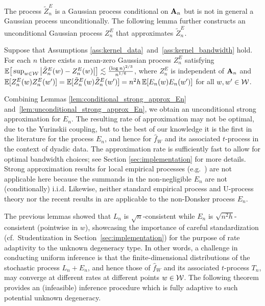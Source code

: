 The process $\tilde Z_n^E$
is a Gaussian process conditional on $\mathbf{A}_n$ but is not in general a
Gaussian process unconditionally.
The following lemma further constructs an unconditional Gaussian process
$Z_n^E$ that approximates $\tilde Z_n^E$.

\begin{lemma}
  \label{lem:unconditional_strong_approx_En}

  Suppose that Assumptions
  \ref{ass:kernel_data}~and~\ref{ass:kernel_bandwidth} hold.
  For each $n$ there exists
  a mean-zero Gaussian process $Z^E_n$ satisfying
  $\mathbb{E}\big[ \sup_{w \in \mathcal{W}} \big|\tilde Z_n^E(w) - Z_n^E(w)\big| \big]
  \lesssim \frac{(\log n)^{2/3}}{n^{1/6}}$,
  where
  $Z_n^E$ is independent of $\mathbf{A}_n$ and
  $\mathbb{E}[Z_n^E(w)Z_n^E(w')]=\mathbb{E}[\tilde Z_n^E(w)\tilde Z_n^E(w')]
  = n^2h \, \mathbb{E}[E_n(w)E_n(w')]$
  for all $w, w' \in \mathcal{W}$.
\end{lemma}

Combining Lemmas \ref{lem:conditional_strong_approx_En}
and~\ref{lem:unconditional_strong_approx_En},
we obtain an unconditional strong approximation for $E_n$.
The resulting rate of approximation may not be optimal,
due to the Yurinskii coupling, but to the best of our knowledge
it is the first in the literature for the process
$E_n$, and hence for $\hat{f}_W$ and its associated $t$-process in the
context of dyadic data.
The approximation rate is
sufficiently fast to allow for optimal bandwidth choices; see Section
\ref{sec:implementation} for more details.
Strong approximation results for local empirical processes
(e.g.\ \citealp{gine2010confidence})
are not applicable here because the summands in the
non-negligible $E_n$
are not (conditionally) i.i.d.
Likewise, neither standard empirical process and U-process theory
\citep{van1996weak,gine2021mathematical} nor the recent results in
\citet{davezies2021exchangeable} are applicable
to the non-Donsker process $E_n$.

The previous lemmas showed that $L_n$ is
$\sqrt{n}$-consistent while $E_n$ is $\sqrt{n^2h}$-consistent
(pointwise in $w$),
showcasing the importance of careful standardization
(cf.\ Studentization in Section~\ref{sec:implementation})
for the purpose of rate
adaptivity to the unknown degeneracy type.
In other
words, a challenge in conducting uniform inference is that the
finite-dimensional distributions of the stochastic process $L_n+E_n$,
and hence those of $\hat{f}_W$ and its associated $t$-process $T_n$,
may converge at different rates at different points $w\in\mathcal{W}$.
The following theorem provides an
(infeasible)
inference procedure which is fully adaptive to
such potential unknown degeneracy.

